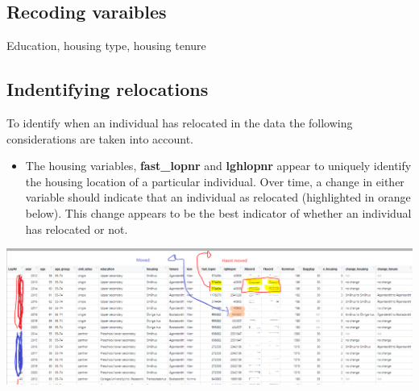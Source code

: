 \documentclass[
]{book}
\providecommand{\tightlist}{%
  \setlength{\itemsep}{0pt}\setlength{\parskip}{0pt}}
\begin{document}
\hypertarget{recoding-varaibles}{%
\subsection{Recoding varaibles}\label{recoding-varaibles}}

Education, housing type, housing tenure

\hypertarget{indentifying-relocations}{%
\subsection{Indentifying relocations}\label{indentifying-relocations}}

To identify when an individual has relocated in the data the following considerations are taken into account.

\begin{itemize}
\tightlist
\item
  The housing variables, \textbf{fast\_lopnr} and \textbf{lghlopnr} appear to uniquely identify the housing location of a particular individual. Over time, a change in either variable should indicate that an individual as relocated (highlighted in orange below). This change appears to be the best indicator of whether an individual has relocated or not.
\end{itemize}

\includegraphics[width=1\linewidth]{output/figures/relocation_id}
\end{document}
